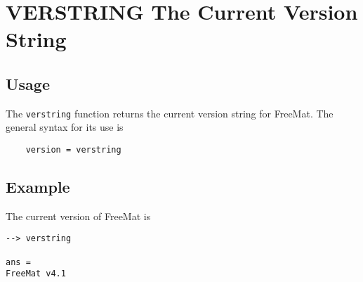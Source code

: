 \section{VERSTRING The Current Version String}

\subsection{Usage}

The \verb|verstring| function returns the current version string for
FreeMat.  The general syntax for its use is
\begin{verbatim}
    version = verstring
\end{verbatim}
\subsection{Example}

The current version of FreeMat is
\begin{verbatim}
--> verstring

ans = 
FreeMat v4.1
\end{verbatim}
